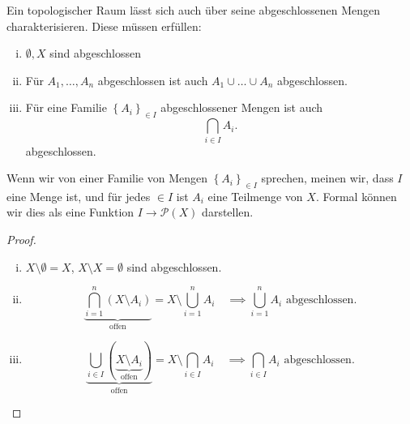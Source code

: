 \begin{theorem}[Dualität]\label{offen-abgeschlossen-ist-dual}
    Ein topologischer Raum lässt sich auch über seine abgeschlossenen Mengen charakterisieren. Diese müssen erfüllen:
    \begin{enumerate}[i)]
        \item $\emptyset,X$ sind abgeschlossen
        \item Für $A_1,\ldots,A_n$ abgeschlossen ist auch $A_1\cup \ldots \cup A_n$ abgeschlossen.
        \item Für eine Familie $\left \{A_i\right\} _{\in I}$ abgeschlossener Mengen ist auch
            \[
            \bigcap_{i\in I} A_i
            .\] 
            abgeschlossen.
    \end{enumerate}
\end{theorem}

\begin{recap}
    Wenn wir von einer Familie von Mengen $\left \{A_i\right\} _{\in I}$ sprechen, meinen wir, dass $I$ eine Menge ist, und für jedes $\in I$ ist $A_i$ eine Teilmenge von  $X$. Formal können wir dies als eine Funktion  $I \to  \mathcal{P}(X)$ darstellen.
\end{recap}
\begin{proof}
    \begin{enumerate}[i)]
        \item $X \setminus \emptyset = X$, $X\setminus X = \emptyset$ sind abgeschlossen.
        \item  \[
                \underbrace{\bigcap_{i=1}^n (X\setminus A_i)}_{\text{offen}} = X \setminus  \bigcup_{i=1}^n A_i \quad \implies \bigcup_{i=1}^n A_i \text{ abgeschlossen}
        .\] 
        \item \[
                \underbrace{\bigcup_{i\in I} (\underbrace{X\setminus A_i}_{\text{offen}})}_{\text{offen}} = X \setminus \bigcap_{i \in I} A_i \quad \implies \bigcap_{i \in I} A_i \text{ abgeschlossen}
        .\] 
    \end{enumerate}
\end{proof}

